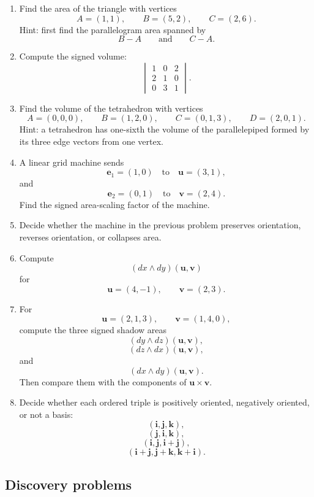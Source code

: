 \begin{enumerate}
\item Find the area of the triangle with vertices
\[
    A=(1,1),
    \qquad
    B=(5,2),
    \qquad
    C=(2,6).
\]
Hint: first find the parallelogram area spanned by
\[
    B-A
    \qquad\text{and}\qquad
    C-A.
\]

\item Compute the signed volume:
\[
    \begin{vmatrix}
        1&0&2\\
        2&1&0\\
        0&3&1
    \end{vmatrix}.
\]

\item Find the volume of the tetrahedron with vertices
\[
    A=(0,0,0),
    \qquad
    B=(1,2,0),
    \qquad
    C=(0,1,3),
    \qquad
    D=(2,0,1).
\]
Hint: a tetrahedron has one-sixth the volume of the parallelepiped formed by its three
edge vectors from one vertex.

\item A linear grid machine sends
\[
    \mathbf e_1=(1,0)
    \quad\text{to}\quad
    \mathbf u=(3,1),
\]
and
\[
    \mathbf e_2=(0,1)
    \quad\text{to}\quad
    \mathbf v=(2,4).
\]
Find the signed area-scaling factor of the machine.

\item Decide whether the machine in the previous problem preserves orientation, reverses
orientation, or collapses area.

\item Compute
\[
    (dx\wedge dy)(\mathbf u,\mathbf v)
\]
for
\[
    \mathbf u=(4,-1),
    \qquad
    \mathbf v=(2,3).
\]

\item For
\[
    \mathbf u=(2,1,3),
    \qquad
    \mathbf v=(1,4,0),
\]
compute the three signed shadow areas
\[
    (dy\wedge dz)(\mathbf u,\mathbf v),
\]
\[
    (dz\wedge dx)(\mathbf u,\mathbf v),
\]
and
\[
    (dx\wedge dy)(\mathbf u,\mathbf v).
\]
Then compare them with the components of \(\mathbf u\times\mathbf v\).

\item Decide whether each ordered triple is positively oriented, negatively oriented, or
not a basis:
\[
    (\mathbf i,\mathbf j,\mathbf k),
\]
\[
    (\mathbf j,\mathbf i,\mathbf k),
\]
\[
    (\mathbf i,\mathbf j,\mathbf i+\mathbf j),
\]
\[
    (\mathbf i+\mathbf j,\mathbf j+\mathbf k,\mathbf k+\mathbf i).
\]
\end{enumerate}

\subsection{Discovery problems}

